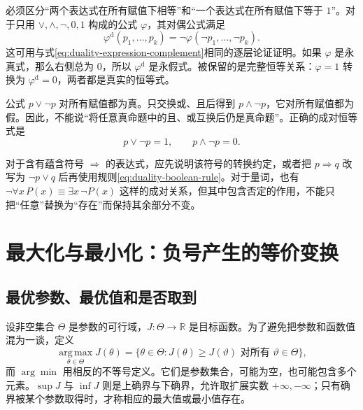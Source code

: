 \documentclass[UTF8,12pt,a4paper,fontset=fandol]{ctexart}
\begin{document}
必须区分“两个表达式在所有赋值下相等”和“一个表达式在所有赋值下等于 $1$”。对于只用 $\lor,\land,\neg,0,1$ 构成的公式 $\varphi$，其对偶公式满足
\begin{equation}
 \varphi^{\mathrm d}(p_1,\ldots,p_k)
 =\neg\varphi(\neg p_1,\ldots,\neg p_k).
 \label{eq:duality-boolean-complement}
\end{equation}
这可用与式\eqref{eq:duality-expression-complement}相同的逐层论证证明。如果 $\varphi$ 是永真式，那么右侧总为 $0$，所以 $\varphi^{\mathrm d}$ 是永假式。被保留的是完整恒等关系：$\varphi=1$ 转换为 $\varphi^{\mathrm d}=0$，两者都是真实的恒等式。

\begin{example}[排中律与矛盾律]
公式 $p\lor\neg p$ 对所有赋值都为真。只交换或、且后得到 $p\land\neg p$，它对所有赋值都为假。因此，不能说“将任意真命题中的且、或互换后仍是真命题”。正确的成对恒等式是
\[
 p\lor\neg p=1,
 \qquad p\land\neg p=0.
\]
\end{example}

对于含有蕴含符号 $\Rightarrow$ 的表达式，应先说明该符号的转换约定，或者把 $p\Rightarrow q$ 改写为 $\neg p\lor q$ 后再使用规则\eqref{eq:duality-boolean-rule}。对于量词，也有 $\neg\forall x\,P(x)\equiv\exists x\,\neg P(x)$ 这样的成对关系，但其中包含否定的作用，不能只把“任意”替换为“存在”而保持其余部分不变。

\section{最大化与最小化：负号产生的等价变换}
\label{sec:duality-sign}

\subsection{最优参数、最优值和是否取到}

设非空集合 $\Theta$ 是参数的可行域，$J:\Theta\to\mathbb R$ 是目标函数。为了避免把参数和函数值混为一谈，定义
\[
 \operatorname*{arg\,max}_{\theta\in\Theta}J(\theta)
 =\{\theta\in\Theta: J(\theta)\geq J(\vartheta)\text{ 对所有 }\vartheta\in\Theta\},
\]
而 $\arg\min$ 用相反的不等号定义。它们是参数集合，可能为空，也可能包含多个元素。$\sup J$ 与 $\inf J$ 则是上确界与下确界，允许取扩展实数 $+\infty,-\infty$；只有确界被某个参数取得时，才称相应的最大值或最小值存在。
\end{document}
